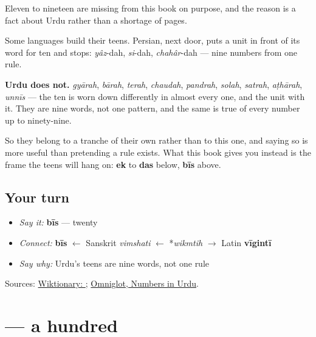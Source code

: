 \begin{grammarlens}[title={Grammar Lens: what is NOT here, and why}]
Eleven to nineteen are missing from this book on purpose, and the reason is a fact about Urdu rather than a shortage of pages.

Some languages build their teens. Persian, next door, puts a unit in front of its word for ten and stops: \emph{yâz}-dah, \emph{si}-dah, \emph{chahâr}-dah — nine numbers from one rule.

\textbf{Urdu does not.} \emph{gyārah}, \emph{bārah}, \emph{terah}, \emph{chaudah}, \emph{pandrah}, \emph{solah}, \emph{satrah}, \emph{aṭhārah}, \emph{unnīs} — the ten is worn down differently in almost every one, and the unit with it. They are nine words, not one pattern, and the same is true of every number up to ninety-nine.

So they belong to a tranche of their own rather than to this one, and saying so is more useful than pretending a rule exists. What this book gives you instead is the frame the teens will hang on: \textbf{ek} to \textbf{das} below, \textbf{bīs} above.
\end{grammarlens}

\subsection*{Your turn}
\begin{itemize}
\raggedright
  \item \emph{Say it:} \textbf{bīs} — twenty
  \item \emph{Connect:} \textbf{bīs} $\leftarrow$ Sanskrit \emph{vimshati} $\leftarrow$ *\emph{wikmtih} $\to$ Latin \textbf{vīgintī}
  \item \emph{Say why:} Urdu's teens are nine words, not one rule
\end{itemize}

\begin{tcolorbox}[breakable,colback=teal!4,colframe=teal!35!black,title={Before you move on}]
Sources: \href{https://en.wiktionary.org/wiki/\%D8\%A8\%DB\%8C\%D8\%B3}{Wiktionary: }; \href{https://www.omniglot.com/language/numbers/urdu.htm}{Omniglot, Numbers in Urdu}.
\end{tcolorbox}
\section[\texorpdfstring{\ur{سو} (sau)}{سو (sau)}]{ — a hundred}

\label{lesson:UR-C30-sau}



